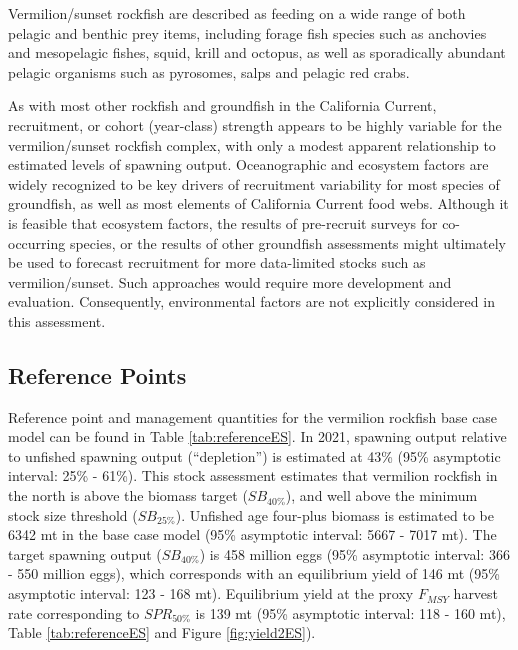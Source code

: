\documentclass[11pt,
  english,
  a4paper,
]{article}
\begin{document}
Vermilion/sunset rockfish are described as feeding on a wide range of both pelagic and benthic prey items, including forage fish species such as anchovies and mesopelagic fishes, squid, krill and octopus, as well as sporadically abundant pelagic organisms such as pyrosomes, salps and pelagic red crabs.

As with most other rockfish and groundfish in the California Current, recruitment, or cohort (year-class) strength appears to be highly variable for the vermilion/sunset rockfish complex, with only a modest apparent relationship to estimated levels of spawning output. Oceanographic and ecosystem factors are widely recognized to be key drivers of recruitment variability for most species of groundfish, as well as most elements of California Current food webs. Although it is feasible that ecosystem factors, the results of pre-recruit surveys for co-occurring species, or the results of other groundfish assessments might ultimately be used to forecast recruitment for more data-limited stocks such as vermilion/sunset. Such approaches would require more development and evaluation. Consequently, environmental factors are not explicitly considered in this assessment.

\FloatBarrier


\hypertarget{reference-points}{%
\subsection*{Reference Points}\label{reference-points}}

\leavevmode\tagmcend\tagstructend

Reference point and management quantities for the vermilion rockfish base case model can be found in Table \ref{tab:referenceES}. In 2021, spawning output relative to unfished spawning output (``depletion'') is estimated at 43\% (95\% asymptotic interval: 25\% - 61\%). This stock assessment estimates that vermilion rockfish in the north is above the biomass target ({\(SB_{40\%}\)\leavevmode\tagmcend\tagstructend}), and well above the minimum stock size threshold ({\(SB_{25\%}\)\leavevmode\tagmcend\tagstructend}). Unfished age four-plus biomass is estimated to be 6342 mt in the base case model (95\% asymptotic interval: 5667 - 7017 mt). The target spawning output ({\(SB_{40\%}\)\leavevmode\tagmcend\tagstructend}) is 458 million eggs (95\% asymptotic interval: 366 - 550 million eggs), which corresponds with an equilibrium yield of 146 mt (95\% asymptotic interval: 123 - 168 mt). Equilibrium yield at the proxy {\(F_{MSY}\)\leavevmode\tagmcend\tagstructend} harvest rate corresponding to {\(SPR_{50\%}\)\leavevmode\tagmcend\tagstructend} is 139 mt (95\% asymptotic interval: 118 - 160 mt), Table \ref{tab:referenceES} and Figure \ref{fig:yield2ES}).
\end{document}
